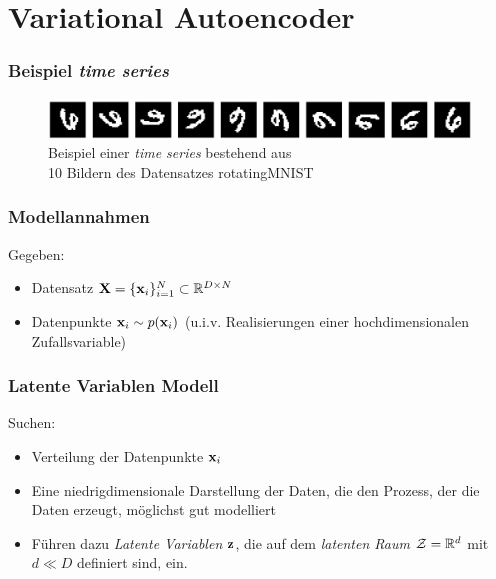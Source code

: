 

\author[Jannis Klingler]{Nix}


\beamertemplatenavigationsymbolsempty{}




\section{Variational Autoencoder}

\begin{frame}
	\frametitle{Beispiel \emph{time series}}
	\begin{figure}[!htbp]
		\includegraphics[scale=0.25]{Bilder/rotatingMNIST}\\
		Beispiel einer \emph{time series} bestehend aus \\10 Bildern des Datensatzes rotatingMNIST
	\end{figure}
\end{frame}

\begin{frame}
	\frametitle{Modellannahmen}
	Gegeben:
	\begin{itemize}
		\item Datensatz $\textbf{X} = \lbrace\mathbf{x}_i \rbrace_{i=1}^{N} \subset \mathbb{R}^{D\times N}$
		\item Datenpunkte $\mathbf{x}_i\sim p(\mathbf{x}_i)$ (u.i.v. Realisierungen einer hochdimensionalen Zufallsvariable)
	\end{itemize}
\end{frame}

\begin{frame}
	\frametitle{Latente Variablen Modell}
	Suchen:
	\begin{itemize}
		\item Verteilung der Datenpunkte $\mathbf{x}_i$
		\item Eine niedrigdimensionale Darstellung der Daten, die den Prozess, der die Daten erzeugt, möglichst gut modelliert
		\item Führen dazu \emph{Latente Variablen} $\mathbf{z}$, die auf dem \emph{latenten Raum} $\mathcal{Z} = \mathbb{R}^d$ mit $d\ll D$ definiert sind, ein.
	\end{itemize}
\end{frame}


